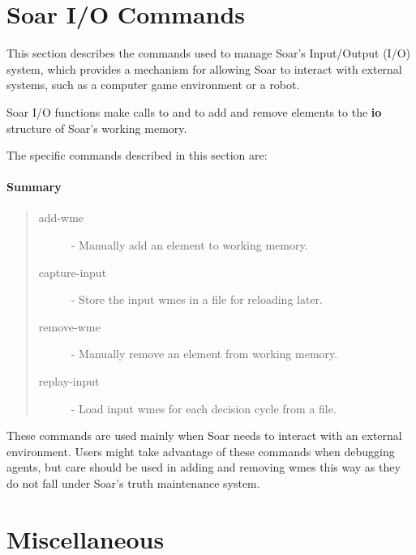 \section{Soar I/O Commands}
\label{SOAR-IO}

This section describes the commands used to manage Soar's Input/Output
(I/O) system, which provides a mechanism for allowing Soar to interact 
with external systems, such as a computer game environment or a robot.  

Soar I/O functions make calls to  and 
to add and remove elements to the \textbf{io} structure of Soar's working
memory. 
 
The specific commands described in this section are:

\paragraph{Summary}
\begin{quote}
\begin{description}
\item[add-wme] - Manually add an element to working memory.
\item[capture-input] - Store the input wmes in a file for reloading later.
\item[remove-wme] - Manually remove an element from working memory.
\item[replay-input] - Load input wmes for each decision cycle from a file.
\end{description}
\end{quote}

These commands are used mainly  when Soar needs to interact with an
external environment.  Users might take advantage of these commands when
debugging agents, but care should be used in adding and removing wmes this
way as they do not fall under Soar's truth maintenance system.






\section{Miscellaneous}
\label{MISC}


